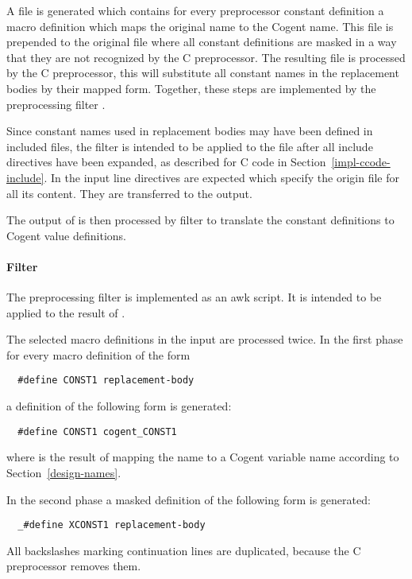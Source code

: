 A file is generated which contains for every preprocessor constant definition a macro definition 
which maps the original name to the Cogent name. This file is prepended to the original file where all
constant definitions are masked in a way that they are not recognized by the C preprocessor.
The resulting file is processed by the C preprocessor, this will substitute all constant names in the replacement 
bodies by their mapped form. Together, these steps are implemented by the preprocessing filter 
.

Since constant names used in replacement bodies may have been defined in included files, the filter
 is intended to be applied to the file after all include directives have been 
expanded, as described for C code in Section~\ref{impl-ccode-include}. In the input line directives
are expected which specify the origin file for all its content. They are transferred to the output.

The output of  is then processed by
filter  to translate the constant definitions to Cogent value definitions.

\paragraph{Filter }

The preprocessing filter is implemented as an awk script. It is intended to be applied to the result
of . 

The selected macro definitions in the input are processed twice. In the first phase for every macro 
definition of the form
\begin{verbatim}
  #define CONST1 replacement-body
\end{verbatim}
a definition of the following form is generated:
\begin{verbatim}
  #define CONST1 cogent_CONST1
\end{verbatim}
where  is the result of mapping the name  to a Cogent variable name
according to Section~\ref{design-names}.

In the second phase a masked definition of the following form is generated:
\begin{verbatim}
  _#define XCONST1 replacement-body
\end{verbatim}
All backslashes marking continuation lines are duplicated, because the C preprocessor removes them.

